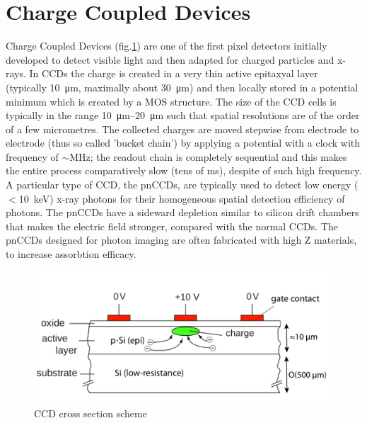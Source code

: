     
\section{Charge Coupled Devices}
   Charge Coupled Devices (fig.\ref{fig:CCD_scheme}) are one of the first pixel detectors initially developed to detect visible light and then adapted for charged particles and x-rays. 
   In CCDs the charge is created in a very thin active epitaxyal layer (typically \SI{10}{\um}, maximally about \SI{30}{\um}) and then locally stored in a potential minimum which is created by a MOS structure. 
   The size of the CCD cells is typically in the range \SIrange{10}{20}{\um} such that spatial resolutions are of the order of a few micrometres.
   The collected charges are moved stepwise from electrode to electrode (thus so called 'bucket chain') by applying a potential with a clock with frequency of $\sim$\si{MHz}; the readout chain is completely sequential and this makes the entire process comparatively slow (tens of \si{ms}), despite of such high frequency.
   A particular type of CCD, the pnCCDs, are typically used to detect low energy ($<$\SI{10}{keV}) x-ray photons for their homogeneous spatial detection efficiency of photons. The pnCCDs have a sideward depletion similar to silicon drift chambers that makes the electric field stronger, compared with the normal CCDs. 
   The pnCCDs designed for photon imaging are often fabricated with high Z materials, to increase assorbtion efficacy.
   \begin{figure}
      \centering
          \includegraphics[width=\linewidth]{figures/Pixel_detectors/CCD.png}
          \caption{CCD cross section scheme}
          \label{fig:CCD_scheme}
   \end{figure}




